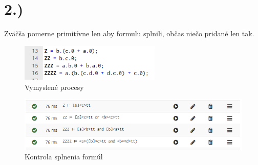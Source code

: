\documentclass[a4paper]{article}
\begin{document}
\section{2.)}

Zväčša pomerne primitívne len aby formulu splnili, občas niečo pridané len tak.

\begin{figure}[!h]
	\centering
	\includegraphics[width=0.6\textwidth]{proc_2.png}
	\caption{Vymyslené procesy}
\end{figure}


\begin{figure}[!h]
	\centering
	\includegraphics[width=1\textwidth]{form_2.png}
	\caption{Kontrola splnenia formúl}
\end{figure}
\end{document}
